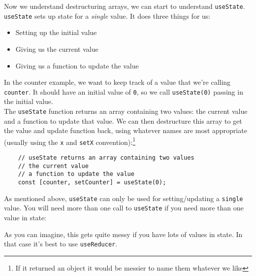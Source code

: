 Now we understand destructuring arrays, we can start to understand \texttt{useState}.
\\

\texttt{useState} sets up state for a \textit{single} value. It does three things for us:

\begin{itemize}
    \item Setting up the initial value
    \item Giving us the current value
    \item Giving us a function to update the value
\end{itemize}

In the counter example, we want to keep track of a value that we're calling \texttt{counter}. It should have an initial value of \texttt{0}, so we call \texttt{useState(0)} passing in the initial value.
\\

The \texttt{useState} function returns an array containing two values: the current value and a function to update that value. We can then destructure this array to get the value and update function back, using whatever names are most appropriate (usually using the \texttt{x} and \texttt{setX} convention):\footnote{If it returned an object it would be messier to name them whatever we like}

\begin{verbatim}
    // useState returns an array containing two values
    // the current value
    // a function to update the value
    const [counter, setCounter] = useState(0);
\end{verbatim}

As mentioned above, \texttt{useState} can only be used for setting/updating a \texttt{single} value. You will need more than one call to \texttt{useState} if you need more than one value in state:


As you can imagine, this gets quite messy if you have lots of values in state. In that case it's best to use \texttt{useReducer}.

\pagebreak

